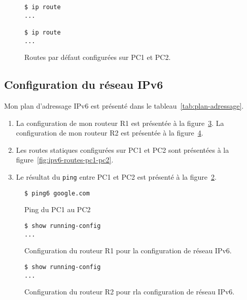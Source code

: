 \documentclass[]{article}
\begin{document}
\begin{figure} 
      \centering
      \begin{lstlisting}
$ ip route
...

$ ip route
...
      \end{lstlisting}
      \caption[]{Routes par défaut configurées sur PC1 et PC2.}
      \label{fig:routes-pc1-pc2}
\end{figure}

\subsection*{Configuration du réseau IPv6}

Mon plan d'adressage IPv6 est présenté dans le tableau~\ref{tab:plan-adressage}.

\begin{enumerate}
      \item La configuration de mon routeur R1 est présentée à la figure~\ref{fig:ipv6-config-r1}. La configuration
            de mon routeur R2 est présentée à la figure~\ref{fig:ipv6-config-r2}.
      \item Les routes statiques configurées sur PC1 et PC2 sont présentées à la figure~\ref{fig:ipv6-routes-pc1-pc2}.
      \item  Le résultat du \texttt{ping} entre PC1 et PC2 est présenté à la figure~\ref{fig:ping6-pc1-pc2}.
\end{enumerate}

\begin{figure} 
      \centering
      \begin{lstlisting}
$ ping6 google.com
      \end{lstlisting}
      \caption[]{Ping du PC1 au PC2}
      \label{fig:ping6-pc1-pc2}
\end{figure}

\begin{figure} 
      \centering
      \begin{lstlisting}
$ show running-config
...
      \end{lstlisting}
      \caption[]{Configuration du routeur R1 pour la configuration de réseau IPv6.}
      \label{fig:ipv6-config-r1}
\end{figure}

\begin{figure} 
      \centering
      \begin{lstlisting}
$ show running-config 
...
      \end{lstlisting}
      \caption[]{Configuration du routeur R2 pour rla configuration de réseau IPv6.}
      \label{fig:ipv6-config-r2}
\end{figure}
\end{document}
